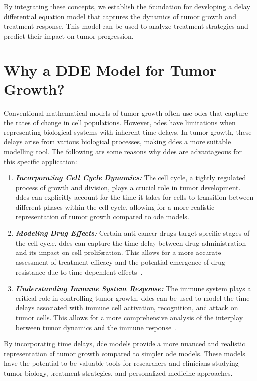 By integrating these concepts, we establish the foundation for developing a delay differential equation model that captures the dynamics of tumor growth and treatment response. This model can be used to analyze treatment strategies and predict their impact on tumor progression.

\section{Why a DDE Model for Tumor Growth?}

Conventional mathematical models of tumor growth often use \gls{ode}s that capture the rates of change in cell populations. However, \gls{ode}s have limitations when representing biological systems with inherent time delays. In tumor growth, these delays arise from various biological processes, making \gls{dde}s a more suitable modelling tool. The following are some reasons why \gls{dde}s are advantageous for this specific application:

\begin{enumerate}
    \item \textbf{\textit{Incorporating Cell Cycle Dynamics:}} The cell cycle, a tightly regulated process of growth and division, plays a crucial role in tumor development. \gls{dde}s can explicitly account for the time it takes for cells to transition between different phases within the cell cycle, allowing for a more realistic representation of tumor growth compared to \gls{ode} models.

    \item \textbf{\textit{Modeling Drug Effects:}} Certain anti-cancer drugs target specific stages of the cell cycle. \gls{dde}s can capture the time delay between drug administration and its impact on cell proliferation. This allows for a more accurate assessment of treatment efficacy and the potential emergence of drug resistance due to time-dependent effects~\cite{zaccagnino_tumorreducing_2017}.

    \item \textbf{\textit{Understanding Immune System Response:}} The immune system plays a critical role in controlling tumor growth. \gls{dde}s can be used to model the time delays associated with immune cell activation, recognition, and attack on tumor cells. This allows for a more comprehensive analysis of the interplay between tumor dynamics and the immune response~\cite{butner_mathematical_2022}.
\end{enumerate}

By incorporating time delays, \gls{dde} models provide a more nuanced and realistic representation of tumor growth compared to simpler \gls{ode} models. These models have the potential to be valuable tools for researchers and clinicians studying tumor biology, treatment strategies, and personalized medicine approaches.
